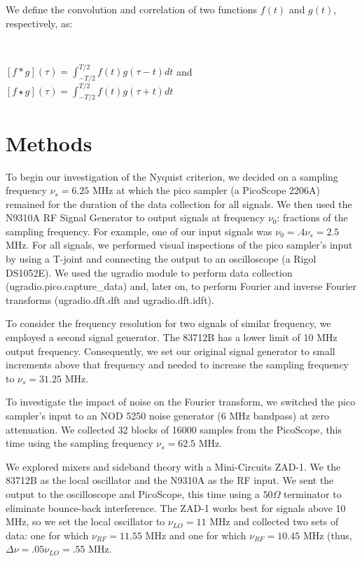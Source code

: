 \documentclass[a4paper]{article}
\begin{document}
We define the convolution and correlation of two functions $f(t)$ and $g(t)$, respectively, as:

\

$[f * g](\tau) = \int_{-T / 2}^{T / 2} f(t) g(\tau - t) dt$ \quad and \quad $[f \star g](\tau) = \int_{-T / 2}^{T / 2} f(t) g(\tau + t) dt$

\section{Methods}


\quad \quad To begin our investigation of the Nyquist criterion, we decided on a sampling frequency $\nu_s = 6.25$ MHz at which the pico sampler (a PicoScope 2206A) remained for the duration of the data collection for all signals. We then used the N9310A RF Signal Generator to output signals at frequency $\nu_0$: fractions of the sampling frequency. For example, one of our input signals was $\nu_0 = .4 \nu_s = 2.5$ MHz. For all signals, we performed visual inspections of the pico sampler's input by using a T-joint and connecting the output to an oscilloscope (a Rigol DS1052E). We used the ugradio module to perform data collection (ugradio.pico.capture\_data) and, later on, to perform Fourier and inverse Fourier transforms (ugradio.dft.dft and ugradio.dft.idft).

To consider the frequency resolution for two signals of similar frequency, we employed a second signal generator. The 83712B has a lower limit of 10 MHz output frequency. Consequently, we set our original signal generator to small increments above that frequency and needed to increase the sampling frequency to $\nu_s = 31.25$ MHz.

To investigate the impact of noise on the Fourier transform, we switched the pico sampler's input to an NOD 5250 noise generator (6 MHz bandpass) at zero attenuation. We collected 32 blocks of 16000 samples from the PicoScope, this time using the sampling frequency $\nu_s = 62.5$ MHz.

We explored mixers and sideband theory with a Mini-Circuits ZAD-1. We the 83712B as the local oscillator and the N9310A as the RF input. We sent the output to the oscilloscope and PicoScope, this time using a $50 \Omega$ terminator to eliminate bounce-back interference. The ZAD-1 works best for signals above 10 MHz, so we set the local oscillator to $\nu_{LO} = 11$ MHz and collected two sets of data: one for which $\nu_{RF} = 11.55$ MHz and one for which $\nu_{RF}=10.45$ MHz (thus, $\Delta \nu = .05 \nu_{LO} = .55$ MHz. 
\end{document}
